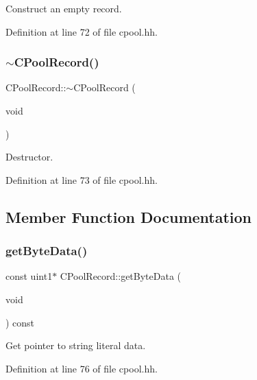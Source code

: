 Construct an empty record. 



Definition at line 72 of file cpool.\+hh.

\mbox{\label{class_c_pool_record_a6168bb58c23b8d8936c5133ce322b6ae}} 
\subsubsection{\texorpdfstring{$\sim$CPoolRecord()}{~CPoolRecord()}}
{\footnotesize\ttfamily C\+Pool\+Record\+::$\sim$\+C\+Pool\+Record (\begin{DoxyParamCaption}\item[{void}]{ }\end{DoxyParamCaption})\hspace{0.3cm}{\ttfamily [inline]}}



Destructor. 



Definition at line 73 of file cpool.\+hh.



\subsection{Member Function Documentation}
\mbox{\label{class_c_pool_record_af0ba95f04fca02b928729e8fefe18096}} 
\subsubsection{\texorpdfstring{getByteData()}{getByteData()}}
{\footnotesize\ttfamily const uint1$\ast$ C\+Pool\+Record\+::get\+Byte\+Data (\begin{DoxyParamCaption}\item[{void}]{ }\end{DoxyParamCaption}) const\hspace{0.3cm}{\ttfamily [inline]}}



Get pointer to string literal data. 



Definition at line 76 of file cpool.\+hh.


